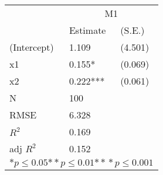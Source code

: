 \begin{tabular}{*{3}{l}}
\hline
                  & \multicolumn{2}{c}{M1}   \tabularnewline
                   &Estimate  &(S.E.)  \tabularnewline
 \hline
 \hline
   (Intercept)     &1.109   &   (4.501) \tabularnewline
   x1              &0.155*   &   (0.069) \tabularnewline
   x2              &0.222***   &   (0.061) \tabularnewline
 \hline
 N                 &100       &        \tabularnewline
 RMSE             &6.328         & \tabularnewline
 $R^2$             &0.169         & \tabularnewline
 adj $R^2$         &0.152         & \tabularnewline
 \hline
\hline
 
 \multicolumn{3}{c}{${*  p}\le 0.05$${*\!\!*  p}\le 0.01$${*\!\!*\!\!*  p}\le 0.001$}\tabularnewline
 \end{tabular}